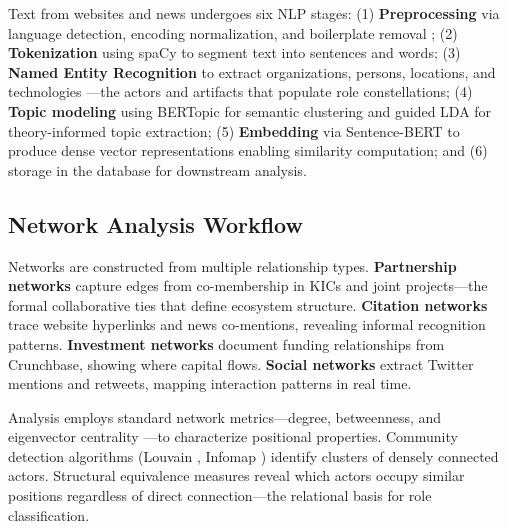 \documentclass[../main.tex]{subfiles}
\begin{document}
Text from websites and news undergoes six NLP stages: (1) \textbf{Preprocessing} via language detection, encoding normalization, and boilerplate removal \cite{bird2009nlp}; (2) \textbf{Tokenization} using spaCy \cite{honnibal2020spacy} to segment text into sentences and words; (3) \textbf{Named Entity Recognition} to extract organizations, persons, locations, and technologies \cite{ner2018survey}---the actors and artifacts that populate role constellations; (4) \textbf{Topic modeling} using BERTopic \cite{grootendorst2022bertopic} for semantic clustering and guided LDA \cite{blei2003lda} for theory-informed topic extraction; (5) \textbf{Embedding} via Sentence-BERT \cite{reimers2019sentence,devlin2019bert} to produce dense vector representations enabling similarity computation; and (6) storage in the database for downstream analysis.

\subsection{Network Analysis Workflow}

Networks are constructed from multiple relationship types. \textbf{Partnership networks} capture edges from co-membership in KICs and joint projects---the formal collaborative ties that define ecosystem structure. \textbf{Citation networks} trace website hyperlinks and news co-mentions, revealing informal recognition patterns. \textbf{Investment networks} document funding relationships from Crunchbase, showing where capital flows. \textbf{Social networks} extract Twitter mentions and retweets, mapping interaction patterns in real time.

Analysis employs standard network metrics---degree, betweenness, and eigenvector centrality \cite{newman2010networks,borgatti2009network}---to characterize positional properties. Community detection algorithms (Louvain \cite{blondel2008louvain}, Infomap \cite{rosvall2008infomap}) identify clusters of densely connected actors. Structural equivalence measures \cite{wasserman1994social} reveal which actors occupy similar positions regardless of direct connection---the relational basis for role classification.
\end{document}

